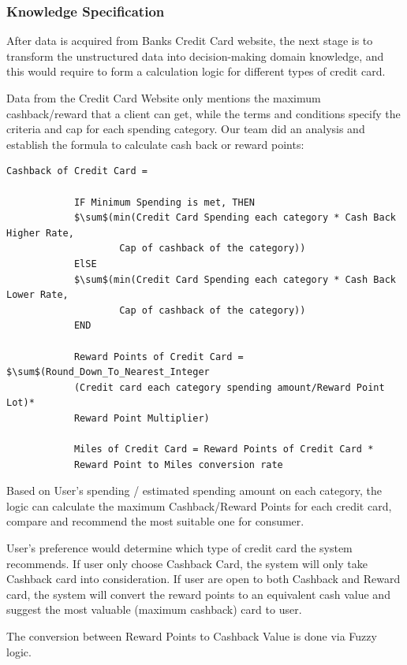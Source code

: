	\subsubsection{Knowledge Specification} %
	\label{ssub:knowledge_specification}
		After data is acquired from Banks Credit Card website, the next stage is to transform the unstructured data into decision-making domain knowledge, and this would require to form a calculation logic for different types of credit card.

		Data from the Credit Card Website only mentions the maximum cashback/reward that a client can get, while the terms and conditions specify the criteria and cap for each spending category. Our team did an analysis and establish the formula to calculate cash back or reward points:

		\lstset{basicstyle=\footnotesize\ttfamily}
		\begin{lstlisting}[frame=single, gobble=11, tabsize=4, showstringspaces=false, mathescape]
			Cashback of Credit Card =

			IF Minimum Spending is met, THEN
			$\sum$(min(Credit Card Spending each category * Cash Back Higher Rate,
					Cap of cashback of the category))
			ElSE
			$\sum$(min(Credit Card Spending each category * Cash Back Lower Rate,
					Cap of cashback of the category))
			END

			Reward Points of Credit Card = $\sum$(Round_Down_To_Nearest_Integer
			(Credit card each category spending amount/Reward Point Lot)*
			Reward Point Multiplier)

			Miles of Credit Card = Reward Points of Credit Card *
			Reward Point to Miles conversion rate
		\end{lstlisting}

		Based on User’s spending / estimated spending amount on each category, the logic can calculate the maximum Cashback/Reward Points for each credit card, compare and recommend the most suitable one for consumer.

		User’s preference would determine which type of credit card the system recommends. If user only choose Cashback Card, the system will only take Cashback card into consideration. If user are open to both Cashback and Reward card, the system will convert the reward points to an equivalent cash value and suggest the most valuable (maximum cashback) card to user.

		The conversion between Reward Points to Cashback Value is done via Fuzzy logic.

